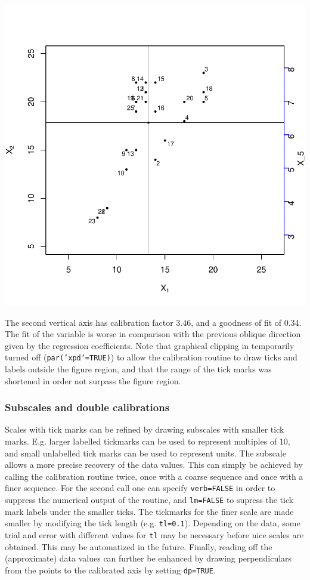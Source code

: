 \documentclass[a4paper]{article}
\begin{document}
\includegraphics{CalibrationGuide-008}

The second vertical axis has calibration factor 3.46, and a goodness of fit of 0.34. The fit of the
variable is worse in comparison with the previous oblique direction given by the regression coefficients. Note
that graphical clipping in temporarily turned off ({\tt par('xpd'=TRUE)}) to allow the calibration 
routine to draw ticks and labels outside the figure region, and that the range of the tick marks was
shortened in order not surpass the figure region.

\subsubsection*{Subscales and double calibrations}

Scales with tick marks can be refined by drawing subscales with smaller tick marks. 
E.g. larger labelled
tickmarks can be used to represent multiples of 10, and small unlabelled tick marks can be used to 
represent units. The subscale allows a more precise recovery of the data values. This can simply be 
achieved by calling the calibration routine twice, once with a coarse sequence and once with a finer 
sequence. For the second call one can specify {\tt verb=FALSE} in order to suppress the numerical output
of the routine, and {\tt lm=FALSE} to supress the tick mark labels under the smaller ticks. The tickmarks
for the finer scale are made smaller by modifying the tick length (e.g. {\tt tl=0.1}). Depending on the data, 
some trial and error with different values for {\tt tl} may be necessary before nice scales are obtained. This
may be automatized in the future. Finally, reading off the (approximate) data values can further be enhanced 
by drawing perpendiculars from the points to the calibrated axis by setting {\tt dp=TRUE}.
\end{document}
